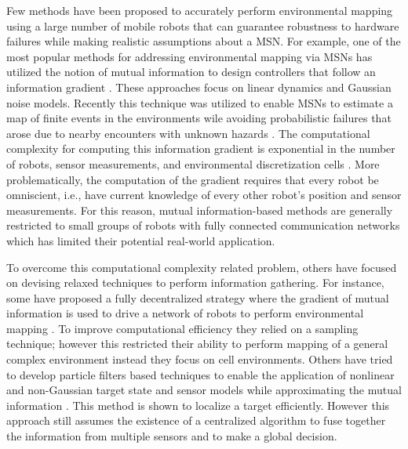 \documentclass[letterpaper, 10 pt, conference]{ieeeconf}
\begin{document}
Few methods have been proposed to accurately perform environmental mapping using a large number of mobile robots that can guarantee robustness to hardware failures while making realistic assumptions about a MSN.
For example, one of the most popular methods for addressing environmental mapping via MSNs has utilized the notion of mutual information to design controllers that follow an information gradient \cite{cortez2011information,pahlajani2014networked,julian2014mutual,schwager2017multi,julian2012distributed}. 
These approaches focus on linear dynamics and Gaussian noise models. 
Recently this technique was utilized to enable MSNs to estimate a map of finite events in the environments wile avoiding probabilistic failures that arose due to nearby encounters with unknown hazards \cite{schwager2017multi}.
The computational complexity for computing this information gradient is exponential in the number of robots, sensor measurements, and environmental discretization cells \cite{schwager2017multi, julian2012distributed,julian2014mutual}.
More problematically, the computation of the gradient requires that every robot be omniscient, i.e., have current knowledge of every other robot’s position and sensor measurements.
For this reason, mutual information-based methods are generally restricted to small groups of robots with fully connected communication networks which has limited their potential real-world application. 

To overcome this computational complexity related problem, others have focused on devising relaxed techniques to perform information gathering.
For instance, some have proposed a fully decentralized strategy where the gradient of mutual information is used to drive a network of robots to perform environmental mapping \cite{julian2012distributed,julian2014mutual}.
To improve computational efficiency they relied on a sampling technique; however this restricted their ability to perform mapping of a general complex environment instead they focus on cell environments. 
Others have tried to develop particle filters based techniques to enable the application of nonlinear and non-Gaussian target state and sensor models while approximating the mutual information \cite{hoffman2010mobile}. 
This method is shown to localize a target efficiently.
However this approach still assumes the existence of a centralized algorithm to fuse together the information from multiple sensors and to make a global decision.
\end{document}
